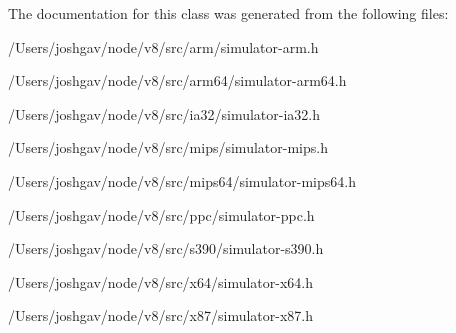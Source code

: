 The documentation for this class was generated from the following files\+:\begin{DoxyCompactItemize}
\item 
/\+Users/joshgav/node/v8/src/arm/simulator-\/arm.\+h\item 
/\+Users/joshgav/node/v8/src/arm64/simulator-\/arm64.\+h\item 
/\+Users/joshgav/node/v8/src/ia32/simulator-\/ia32.\+h\item 
/\+Users/joshgav/node/v8/src/mips/simulator-\/mips.\+h\item 
/\+Users/joshgav/node/v8/src/mips64/simulator-\/mips64.\+h\item 
/\+Users/joshgav/node/v8/src/ppc/simulator-\/ppc.\+h\item 
/\+Users/joshgav/node/v8/src/s390/simulator-\/s390.\+h\item 
/\+Users/joshgav/node/v8/src/x64/simulator-\/x64.\+h\item 
/\+Users/joshgav/node/v8/src/x87/simulator-\/x87.\+h\end{DoxyCompactItemize}
